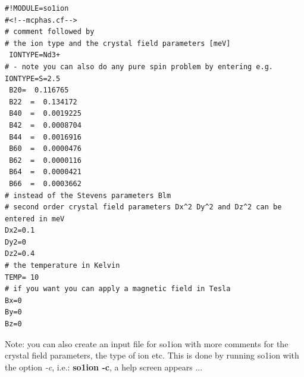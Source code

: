 \begin{verbatim}
#!MODULE=so1ion
#<!--mcphas.cf-->
# comment followed by
# the ion type and the crystal field parameters [meV]
 IONTYPE=Nd3+
# - note you can also do any pure spin problem by entering e.g. IONTYPE=S=2.5 
 B20=  0.116765                                           
 B22  =  0.134172                                           
 B40  =  0.0019225                                          
 B42  =  0.0008704                                          
 B44  =  0.0016916                                          
 B60  =  0.0000476                                          
 B62  =  0.0000116                                          
 B64  =  0.0000421                                          
 B66  =  0.0003662       
# instead of the Stevens parameters Blm 
# second order crystal field parameters Dx^2 Dy^2 and Dz^2 can be entered in meV
Dx2=0.1
Dy2=0
Dz2=0.4
# the temperature in Kelvin
TEMP= 10
# if you want you can apply a magnetic field in Tesla
Bx=0
By=0
Bz=0
\end{verbatim}

Note: you can also create an input file for so1ion with more comments for the crystal field
parameters, the type of ion etc. This is done by running {\prg so1ion} with the
option {\em -c}, i.e.: {\bf so1ion -c}, a help screen appears ...

